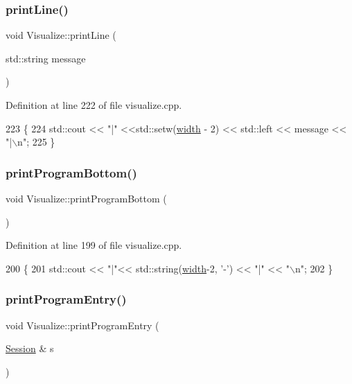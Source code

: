 \subsubsection{\texorpdfstring{print\+Line()}{printLine()}}
{\footnotesize\ttfamily void Visualize\+::print\+Line (\begin{DoxyParamCaption}\item[{std\+::string}]{message }\end{DoxyParamCaption})}



Definition at line 222 of file visualize.\+cpp.


\begin{DoxyCode}
223 \{
224     std::cout << \textcolor{stringliteral}{"|"} <<std::setw(\hyperlink{class_visualize_af5ac723ad5f8fe8c4a8378bf1299cda7}{width} - 2) << std::left << message << \textcolor{stringliteral}{"|\(\backslash\)n"};
225 \}
\end{DoxyCode}
\mbox{\label{class_visualize_ac0be9ece2d80a7d1e34724fb87424216}} 
\subsubsection{\texorpdfstring{print\+Program\+Bottom()}{printProgramBottom()}}
{\footnotesize\ttfamily void Visualize\+::print\+Program\+Bottom (\begin{DoxyParamCaption}{ }\end{DoxyParamCaption})}



Definition at line 199 of file visualize.\+cpp.


\begin{DoxyCode}
200 \{   
201     std::cout << \textcolor{stringliteral}{"|"}<< std::string(\hyperlink{class_visualize_af5ac723ad5f8fe8c4a8378bf1299cda7}{width}-2, \textcolor{charliteral}{'-'}) << \textcolor{stringliteral}{"|"} << \textcolor{stringliteral}{"\(\backslash\)n"};
202 \}
\end{DoxyCode}
\mbox{\label{class_visualize_a29f27ff8c5e59163eea2be42ff372405}} 
\subsubsection{\texorpdfstring{print\+Program\+Entry()}{printProgramEntry()}}
{\footnotesize\ttfamily void Visualize\+::print\+Program\+Entry (\begin{DoxyParamCaption}\item[{\hyperlink{struct_session}{Session} \&}]{s }\end{DoxyParamCaption})}



